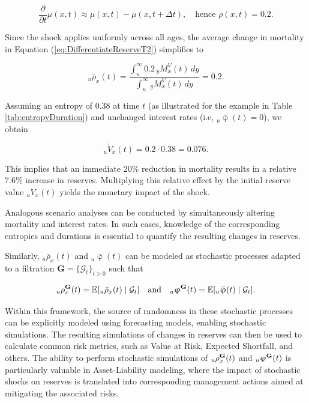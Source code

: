 \documentclass[12pt]{article}
\begin{document}
\begin{equation} \nonumber
	\frac{\partial}{\partial t} \mu(x,t) \approx \mu(x,t) - \mu(x,t+\Delta t), \quad \text{hence } \rho(x,t) = 0.2.
\end{equation}

Since the shock applies uniformly across all ages, the average change in mortality in Equation (\ref{eq:DifferentiateReserveT2}) simplifies to  

\begin{equation} \nonumber
	{}_u\bar{\rho}_x(t) = \frac{\int_u^\infty 0.2 \, {}_yM^V_x(t) \, dy}{\int_u^\infty {}_yM^V_x(t) \, dy} = 0.2.
\end{equation}

Assuming an entropy of 0.38 at time $t$ (as illustrated for the example in Table \ref{tab:entropyDuration}) and unchanged interest rates (i.e, ${}_u\bar{\upvarphi}(t)=0$), we obtain  

\begin{equation} \nonumber
	{}_u\acute{V}_x(t) = 0.2 \cdot 0.38 = 0.076.
\end{equation}

This implies that an immediate 20\% reduction in mortality results in a relative 7.6\% increase in reserves. Multiplying this relative effect by the initial reserve value ${}_uV_x(t)$ yields the monetary impact of the shock.

Analogous scenario analyses can be conducted by simultaneously altering mortality and interest rates. In such cases, knowledge of the corresponding entropies and durations is essential to quantify the resulting changes in reserves.

\color{black}

Similarly, \( {}_u\bar{\rho}_x(t) \) and \( {}_u\bar{\upvarphi}(t) \) can be modeled as stochastic processes adapted to a filtration \( \textbf{G} = \{\mathcal{G}_t\}_{t \ge 0} \) such that 

\[
{}_u{\rho}^{\bf{G}}_x(t) = \mathbb{E}[{}_u\bar{\rho}_x(t) \mid \mathcal{G}_t] \quad \text{and} \quad {}_u{\upvarphi}^{\bf{G}}(t) = \mathbb{E}[{}_u\bar{\upvarphi}(t) \mid \mathcal{G}_t].
\]

Within this framework, the source of randomness in these stochastic processes can be explicitly modeled using forecasting models, enabling stochastic simulations. The resulting simulations of changes in reserves can then be used to calculate common risk metrics, such as Value at Risk, Expected Shortfall, and others. The ability to perform stochastic simulations of \( {}_u{\rho}^{\bf{G}}_x(t) \) and \( {}_u{\upvarphi}^{\bf{G}}(t) \) is particularly valuable in Asset-Liability modeling, where the impact of stochastic shocks on reserves is translated into corresponding management actions aimed at mitigating the associated risks.
\end{document}
